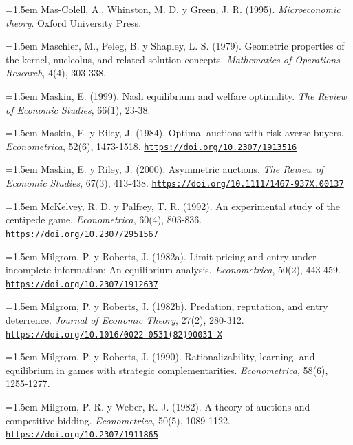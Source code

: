 \documentclass[10pt,a4paper]{article}
\begin{document}
\noindent\hangindent=1.5em Mas-Colell, A., Whinston, M. D. y Green, J. R. (1995). \textit{Microeconomic theory}. Oxford University Press.

\noindent\hangindent=1.5em Maschler, M., Peleg, B. y Shapley, L. S. (1979). Geometric properties of the kernel, nucleolus, and related solution concepts. \textit{Mathematics of Operations Research}, 4(4), 303-338.

\noindent\hangindent=1.5em Maskin, E. (1999). Nash equilibrium and welfare optimality. \textit{The Review of Economic Studies}, 66(1), 23-38.

\noindent\hangindent=1.5em Maskin, E. y Riley, J. (1984). Optimal auctions with risk averse buyers. \textit{Econometrica}, 52(6), 1473-1518. \href{https://doi.org/10.2307/1913516}{\nolinkurl{https://doi.org/10.2307/1913516}}

\noindent\hangindent=1.5em Maskin, E. y Riley, J. (2000). Asymmetric auctions. \textit{The Review of Economic Studies}, 67(3), 413-438. \href{https://doi.org/10.1111/1467-937X.00137}{\nolinkurl{https://doi.org/10.1111/1467-937X.00137}}

\noindent\hangindent=1.5em McKelvey, R. D. y Palfrey, T. R. (1992). An experimental study of the centipede game. \textit{Econometrica}, 60(4), 803-836. \href{https://doi.org/10.2307/2951567}{\nolinkurl{https://doi.org/10.2307/2951567}}

\noindent\hangindent=1.5em Milgrom, P. y Roberts, J. (1982a). Limit pricing and entry under incomplete information: An equilibrium analysis. \textit{Econometrica}, 50(2), 443-459. \href{https://doi.org/10.2307/1912637}{\nolinkurl{https://doi.org/10.2307/1912637}}

\noindent\hangindent=1.5em Milgrom, P. y Roberts, J. (1982b). Predation, reputation, and entry deterrence. \textit{Journal of Economic Theory}, 27(2), 280-312. \href{https://doi.org/10.1016/0022-0531(82)90031-X}{\nolinkurl{https://doi.org/10.1016/0022-0531(82)90031-X}}

\noindent\hangindent=1.5em Milgrom, P. y Roberts, J. (1990). Rationalizability, learning, and equilibrium in games with strategic complementarities. \textit{Econometrica}, 58(6), 1255-1277.

\noindent\hangindent=1.5em Milgrom, P. R. y Weber, R. J. (1982). A theory of auctions and competitive bidding. \textit{Econometrica}, 50(5), 1089-1122. \href{https://doi.org/10.2307/1911865}{\nolinkurl{https://doi.org/10.2307/1911865}}
\end{document}
